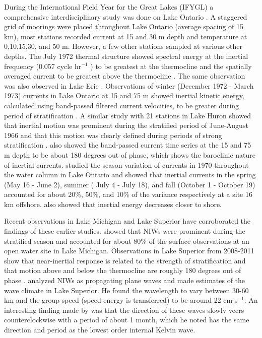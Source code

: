 During the International Field Year for the Great Lakes (IFYGL) a comprehensive interdisciplinary study was done on Lake Ontario \citep{ifygl}. A staggered grid of moorings were
placed throughout Lake Ontario (average spacing of 15 km), most stations recorded current at 15 and 30 m depth and temperature at 0,10,15,30, and 50 m. However, a few
other stations sampled at various other depths. The July 1972 thermal structure showed spectral energy at the inertial frequency (0.057 cycle hr$^{-1}$ ) to be greatest at the thermocline 
and the spatially averaged current to be greatest above the thermocline  \citep{pickett_1975}. The same observation was also observed in Lake Erie \citep{boyce_etal_1987}. 
Observations of winter (December 1972 - March 1973) currents in Lake Ontario  at 15 and 75 m showed inertial kinetic energy, calculated using band-passed filtered current velocities, 
to be greater during period of stratification \citep{marmorino_1978}. 
A similar study with 21 stations in Lake Huron showed that inertial motion was prominent during the stratified period of June-August 1966 and that this motion was clearly defined during periods of strong stratification  \citep{sloss_1976}. \citet{marmorino_1978}  also showed the band-passed current time series at the 15 and 75 m depth to be about 180 degrees out of phase, which shows the baroclinic nature of inertial currents. \citet{blanton_1974} studied the season variation of currents in 1970 throughout the water column in Lake Ontario and showed that inertial currents in the spring (May 16 - June 2), summer ( July 4 - July 18),  and fall (October 1 - October 19) accounted for about 20\%, 50\%, and 10\% of the variance respectively at a site 16 km offshore. \citet{blanton_1974}  also showed that inertial energy decreases closer to shore. 

Recent observations in Lake Michigan and Lake Superior have corroborated the findings of these earlier studies. \citet{choi_2012} showed that NIWs were prominent during the stratified season and accounted for about 80\% of the surface observations at an open water site in Lake Michigan. Observations in Lake Superior from 2008-2011 show that near-inertial response is related to the strength of stratification and that motion above and below the thermocline are roughly 180 degrees out of phase \citep{austin_2013}. \citet{austin_2013} analyzed
NIWs as propagating plane waves and made estimates of the wave climate in Lake Superior. He found the wavelength to vary between 30-60 km and the group speed (speed energy is transferred) to be around 22 cm s$^{-1}$. An interesting finding made by \citet{austin_2013} was that the direction of these waves slowly veers counterclockwise with a period of about 1 month,  which he noted has the same direction and period as the lowest order internal Kelvin wave.

